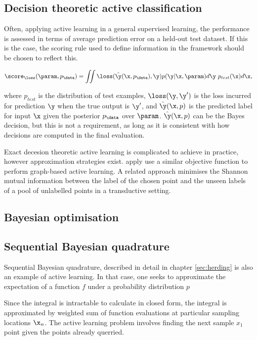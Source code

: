 \citep{MacKay,BALD}

\subsection{Decision theoretic active classification}

Often, applying active learning in a general supervised learning, the performance is assessed in terms of average prediction error on a held-out test dataset. If this is the case, the scoring rule used to define information in the framework should be chosen to reflect this.

\begin{equation}
	\score_{\loss}(\param,p_\data) = \iint \loss(\hat{\y}(\x,p_\data),\y) p(\y\vert\x,\param) d\y\ p_{test}(\x) d\x,
\end{equation}

where $p_{test}$ is the distribution of test examples, $\loss(\y,\y')$ is the loss incurred for prediction $\y$ when the true output is $\y'$, and $\hat{\y}(\x,p)$ is the predicted label for input $\x$ given the posterior $p_\data$ over $\param$. $\hat{\y}(\x,p)$ can be the Bayes decision, but this is not a requirement, as long as it is consistent with how decisions are computed in the final evaluation.

Exact decesion theoretic active learning is complicated to achieve in practice, however approximation strategies exist. \citet{} apply \citet{ZhuGhahramani} use a similar objective function to perform graph-based active learning.
A related approach minimises the Shannon mutual information between the label of the chosen point and the unseen labels of a pool of unlabelled points in a transductive setting.

\subsection{Bayesian optimisation}

\subsection{Sequential Bayesian quadrature}

Sequential Bayesian quadrature, described in detail in chapter \ref{sec:herding} is also an example of active learning. In that case, one seeks to approximate the expectation of a function $f$ under a probability distribution $p$

Since the integral is intractable to calculate in closed form, the integral is approximated by weighted sum of function evaluations at particular sampling locations $\x_n$. The active learning problem involves finding the next sample $x_1$ point given the points already querried.

